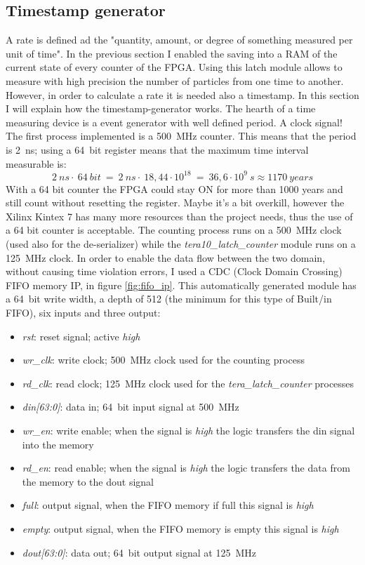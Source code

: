 \subsection{Timestamp generator}\label{Timestamp}
\noindent A rate is defined ad the "quantity, amount, or degree of something measured per unit of time". In the previous section I enabled the saving into a RAM of the current state of every counter of the FPGA. Using this latch module allows to measure with high precision the number of particles from one time to another. However, in order to calculate a rate it is needed also a timestamp. In this section I will explain how the timestamp-generator works.
The hearth of a time measuring device is a event generator with well defined period. A clock signal!
The first process implemented is a 500~MHz counter.
This means that the period is 2~ns; using a 64~bit register means that the maximum time interval measurable is:
\begin{equation}
	2 \: ns \cdot \: 64 \: bit \: =\: 2 \: ns \cdot \: 18,44\cdot10^{18} \: = \: 36,6\cdot10^{9} \: s \approx 1170 \: years 
\end{equation}
\noindent With a 64 bit counter the FPGA could stay ON for more than 1000 years and still count without resetting the register. Maybe it's a bit overkill, however the Xilinx Kintex 7 has many more resources than the project needs, thus the use of a 64 bit counter is acceptable.
The counting process runs on a 500~MHz clock (used also for the de-serializer) while the \textit{tera10\_latch\_counter} module runs on a 125~MHz clock. In order to enable the data flow between the two domain, without causing time violation errors, I used a CDC (Clock Domain Crossing) FIFO memory IP, in figure \ref{fig:fifo_ip}.
This automatically generated module has a 64~bit write width, a depth of 512 (the minimum for this type of Built/in FIFO), six inputs and three output:
\begin{itemize}
	\item \textit{rst}: reset signal; active \textit{high}
	\item \textit{wr\_clk}: write clock; 500~MHz clock used for the counting process
	\item \textit{rd\_clk}: read clock; 125~MHz clock used for the \textit{tera\_latch\_counter} processes
	\item \textit{din[63:0]}: data in; 64~bit input signal at 500~MHz
	\item \textit{wr\_en}: write enable; when the signal is \textit{high} the logic transfers the din signal into the memory
	\item \textit{rd\_en}: read enable; when the signal is \textit{high} the logic transfers the data from the memory to the dout signal
	\item \textit{full}: output signal, when the FIFO memory if full this signal is \textit{high}
	\item \textit{empty}: output signal, when the FIFO memory is empty this signal is \textit{high}
	\item \textit{dout[63:0]}: data out; 64~bit output signal at 125~MHz
\end{itemize}
